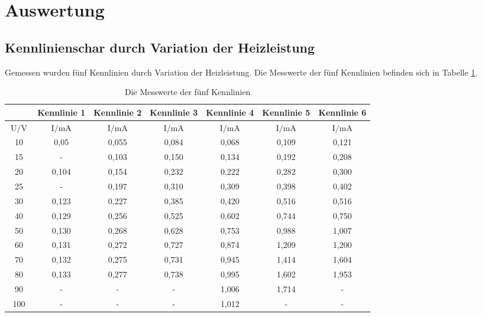 \section{Auswertung}

\subsection{Kennlinienschar durch Variation der Heizleistung}


\begin{flushleft}
    Gemessen wurden fünf Kennlinien durch Variation der Heizleistung.
    Die Messwerte der fünf Kennlinien befinden sich in Tabelle \ref{Tabelle1}.
\end{flushleft} 

\begin{table}[H]
    \centering
    \caption{Die Messwerte der fünf Kennlinien} 
    \label{Tabelle1}
    \begin{tabular} {c  c  c  c  c  c  c}
        \toprule
        { } &
        {Kennlinie 1} &
        {Kennlinie 2} &
        {Kennlinie 3} &
        {Kennlinie 4} &
        {Kennlinie 5} &
        {Kennlinie 6} \\
        \midrule
        {$ \text{U} \mathbin{/} \unit{\volt} $} & 
        {$ \text{I} \mathbin{/} \unit{\milli\ampere} $} &
        {$ \text{I} \mathbin{/} \unit{\milli\ampere} $} &
        {$ \text{I} \mathbin{/} \unit{\milli\ampere} $} &
        {$ \text{I} \mathbin{/} \unit{\milli\ampere} $} &
        {$ \text{I} \mathbin{/} \unit{\milli\ampere} $} &
        {$ \text{I} \mathbin{/} \unit{\milli\ampere} $} \\
        \hline
        10  & 0,05  & 0,055 & 0,084 & 0,068 & 0,109 & 0,121 \\
        15  & -     & 0,103 & 0,150 & 0,134 & 0,192 & 0,208 \\
        20  & 0,104 & 0,154 & 0,232 & 0,222 & 0,282 & 0,300 \\
        25  & -     & 0,197 & 0,310 & 0,309 & 0,398 & 0,402 \\
        30  & 0,123 & 0,227 & 0,385 & 0,420 & 0,516 & 0,516 \\
        40  & 0,129 & 0,256 & 0,525 & 0,602 & 0,744 & 0,750 \\
        50  & 0,130 & 0,268 & 0,628 & 0,753 & 0,988 & 1,007 \\
        60  & 0,131 & 0,272 & 0,727 & 0,874 & 1,209 & 1,200 \\
        70  & 0,132 & 0,275 & 0,731 & 0,945 & 1,414 & 1,604 \\
        80  & 0,133 & 0,277 & 0,738 & 0,995 & 1,602 & 1,953 \\
        90  & -     & -     &  -    & 1,006 & 1,714 & -     \\
        100 & -     & -     &  -    & 1,012 & -     & -     \\
        \bottomrule
    \end{tabular} 
\end{table}

